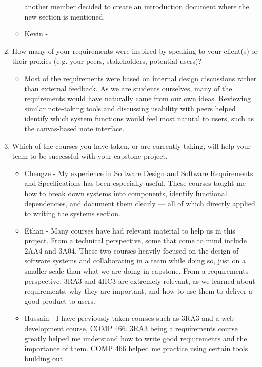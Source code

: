 \begin{enumerate}
\begin{itemize}
        another member decided to create an introduction document where the
        new section is mentioned. 
        \item Kevin - 
  \end{itemize} 
  \item How many of your requirements were inspired by speaking to your
  client(s) or their proxies (e.g. your peers, stakeholders, potential users)?
  \begin{itemize}
        \item Most of the requirements were based on internal design discussions 
        rather than external feedback. As we are students ourselves, many of the 
        requirements would have naturally came from our own ideas. Reviewing 
        similar note-taking tools and discussing usability with peers helped 
        identify which system functions would feel most natural to users, such 
        as the canvas-based note interface.
  \end{itemize} 
  \item Which of the courses you have taken, or are currently taking, will help
  your team to be successful with your capstone project.
  \begin{itemize}
        \item Chengze - My experience in Software Design and Software Requirements 
        and Specifications has been especially useful. These courses taught me how 
        to break down systems into components, identify functional dependencies, and 
        document them clearly — all of which directly applied to writing the systems section.
        \item Ethan - Many courses have had relevant material to help us in
          this project. From a technical perspective, some that come to mind
          include 2AA4 and 3A04. These two courses heavily focused on the
          design of software systems and collaborating in a team while doing
          so, just on a smaller scale than what we are doing in capstone. From
          a requirements perspective, 3RA3 and 4HC3 are extremely relevant, as
          we learned about requirements, why they are important, and how to use
          them to deliver a good product to users.
        \item Hussain - I have previously taken courses such as 3RA3 and a web
        development course, COMP 466. 3RA3 being a requirements course greatly 
        helped me understand how to write good requirements and the importance
        of them. COMP 466 helped me practice using certain tools building out

\end{itemize}
\end{enumerate}
